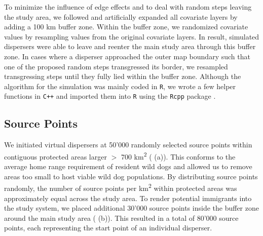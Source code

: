 \documentclass[abstract=on,10pt,a4paper,bibliography=totocnumbered]{article}
\begin{document}
To minimize the influence of edge effects and to deal with random steps leaving
the study area, we followed \citep{Koen.2010} and artificially expanded all
covariate layers by adding a 100 km buffer zone. Within the buffer zone, we
randomized covariate values by resampling values from the original covariate
layers. In result, simulated dispersers were able to leave and reenter the main
study area through this buffer zone. In cases where a disperser approached the
outer map boundary such that one of the proposed random steps transgressed its
border, we resampled transgressing steps until they fully lied within the buffer
zone. Although the algorithm for the simulation was mainly coded in {\tt R}, we
wrote a few helper functions in {\tt C++} and imported them into {\tt R} using
the {\tt Rcpp} package \citep{Eddelbuettel.2011, Eddelbuettel.2013}.

\subsection{Source Points}
We initiated virtual dispersers at 50'000 randomly selected source points within
contiguous protected areas larger \(>\) 700 km\textsuperscript{2}
( (a)). This conforms to the average home range requirement
of resident wild dogs \citep{Pomilia.2015} and allowed us to remove areas too
small to host viable wild dog populations. By distributing source points
randomly, the number of source points per km\textsuperscript{2} within protected
areas was approximately equal across the study area. To render potential
immigrants into the study system, we placed additional 30'000 source points
inside the buffer zone around the main study area ( (b)).
This resulted in a total of 80'000 source points, each representing the start
point of an individual disperser.
\end{document}
